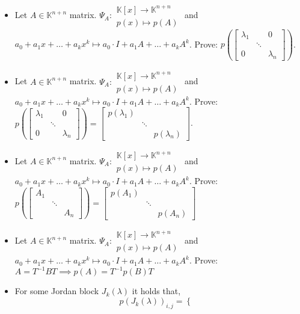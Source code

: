 \documentclass[a4paper]{article}
\begin{document}
\begin{itemize}
  \item Let $A \in \mathbb K^{n + n}$ matrix. $\Psi_A: \substack{\mathbb K[x] \to \mathbb K^{n + n} \\ p(x) \mapsto p(A)}$ and $a_0 + a_1 x + \dots + a_k x^k \mapsto a_0 \cdot I + a_1 A + \dots + a_k A^k$. Prove: $p\left(\begin{bmatrix} \lambda_1 & & 0 \\ & \ddots & \\ 0 & & \lambda_n \end{bmatrix}\right)$.
  \item Let $A \in \mathbb K^{n + n}$ matrix. $\Psi_A: \substack{\mathbb K[x] \to \mathbb K^{n + n} \\ p(x) \mapsto p(A)}$ and $a_0 + a_1 x + \dots + a_k x^k \mapsto a_0 \cdot I + a_1 A + \dots + a_k A^k$. Prove: $p\left(\begin{bmatrix} \lambda_1 & & 0 \\ & \ddots & \\ 0 & & \lambda_n \end{bmatrix}\right) = \begin{bmatrix} p(\lambda_1) & & \\ & \ddots & \\ & & p(\lambda_n) \end{bmatrix}$.
  \item Let $A \in \mathbb K^{n + n}$ matrix. $\Psi_A: \substack{\mathbb K[x] \to \mathbb K^{n + n} \\ p(x) \mapsto p(A)}$ and $a_0 + a_1 x + \dots + a_k x^k \mapsto a_0 \cdot I + a_1 A + \dots + a_k A^k$. Prove: $p\left(\begin{bmatrix} A_1 & & \\ & \ddots & \\ & & A_n \end{bmatrix}\right) = \begin{bmatrix} p(A_1) & & \\ & \ddots & \\ & & p(A_n) \end{bmatrix}$
  \item Let $A \in \mathbb K^{n + n}$ matrix. $\Psi_A: \substack{\mathbb K[x] \to \mathbb K^{n + n} \\ p(x) \mapsto p(A)}$ and $a_0 + a_1 x + \dots + a_k x^k \mapsto a_0 \cdot I + a_1 A + \dots + a_k A^k$. Prove: $A = T^{-1} BT \implies p(A) = T^{-1} p(B) T$
  \item For some Jordan block $J_k(\lambda)$ it holds that,
    \[
      p(J_k(\lambda))_{i,j} = \begin{cases}

\end{cases}\]
\end{itemize}
\end{document}

